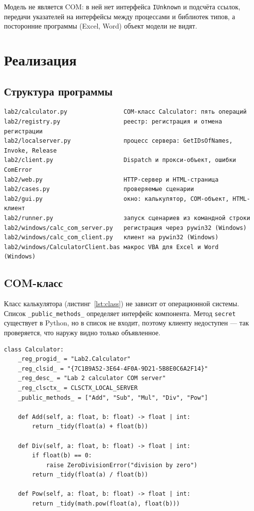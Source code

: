 \documentclass[14pt,a4paper]{extarticle}
\begin{document}
Модель не является COM: в ней нет интерфейса \texttt{IUnknown} и подсчёта ссылок,
передачи указателей на интерфейсы между процессами и библиотек типов, а посторонние
программы (Excel, Word) объект модели не видят.

\section{Реализация}

\subsection{Структура программы}

\begin{Verbatim}[fontsize=\scriptsize, frame=single, samepage=true]
lab2/calculator.py                COM-класс Calculator: пять операций
lab2/registry.py                  реестр: регистрация и отмена регистрации
lab2/localserver.py               процесс сервера: GetIDsOfNames, Invoke, Release
lab2/client.py                    Dispatch и прокси-объект, ошибки ComError
lab2/web.py                       HTTP-сервер и HTML-страница
lab2/cases.py                     проверяемые сценарии
lab2/gui.py                       окно: калькулятор, COM-объект, HTML-клиент
lab2/runner.py                    запуск сценариев из командной строки
lab2/windows/calc_com_server.py   регистрация через pywin32 (Windows)
lab2/windows/calc_com_client.py   клиент на pywin32 (Windows)
lab2/windows/CalculatorClient.bas макрос VBA для Excel и Word (Windows)
\end{Verbatim}

\subsection{COM-класс}

Класс калькулятора (листинг~\ref{lst:class}) не зависит от операционной системы.
Список \texttt{\_public\_methods\_} определяет интерфейс компонента. Метод
\texttt{secret} существует в Python, но в список не входит, поэтому клиенту недоступен
--- так проверяется, что наружу видно только объявленное.

\begin{lstlisting}[style=python, caption={COM-класс калькулятора}, label={lst:class}]
class Calculator:
    _reg_progid_ = "Lab2.Calculator"
    _reg_clsid_ = "{7C1B9A52-3E64-4F0A-9D21-5B8E0C6A2F14}"
    _reg_desc_ = "Lab 2 calculator COM server"
    _reg_clsctx_ = CLSCTX_LOCAL_SERVER
    _public_methods_ = ["Add", "Sub", "Mul", "Div", "Pow"]

    def Add(self, a: float, b: float) -> float | int:
        return _tidy(float(a) + float(b))

    def Div(self, a: float, b: float) -> float | int:
        if float(b) == 0:
            raise ZeroDivisionError("division by zero")
        return _tidy(float(a) / float(b))

    def Pow(self, a: float, b: float) -> float | int:
        return _tidy(math.pow(float(a), float(b)))
\end{lstlisting}
\end{document}
